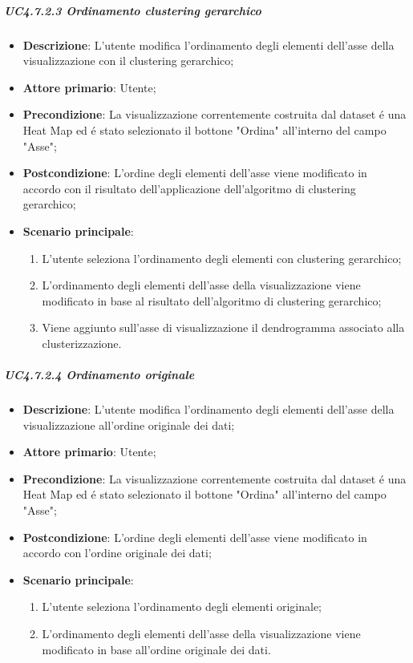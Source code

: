 \subparagraph{UC4.7.2.3 Ordinamento clustering gerarchico}
\label{spar:uc4.7.2.3}
\begin{itemize}
    \item \textbf{Descrizione}:     L'utente modifica l'ordinamento degli elementi dell'asse della visualizzazione con il clustering gerarchico;
    \item \textbf{Attore primario}: Utente;
    \item \textbf{Precondizione}:   La visualizzazione correntemente costruita dal dataset é una Heat Map ed é stato selezionato il bottone "Ordina" all'interno del campo "Asse";
    \item \textbf{Postcondizione}:  L'ordine degli elementi dell'asse viene modificato in accordo con il risultato dell'applicazione dell'algoritmo di clustering gerarchico;
    \item \textbf{Scenario principale}:
    \begin{enumerate}
        \item L'utente seleziona l'ordinamento degli elementi con clustering gerarchico;
        \item L'ordinamento degli elementi dell'asse della visualizzazione viene modificato in base al risultato dell'algoritmo di clustering gerarchico;
        \item Viene aggiunto sull'asse di visualizzazione il dendrogramma associato alla clusterizzazione.
    \end{enumerate}
\end{itemize}

\subparagraph{UC4.7.2.4 Ordinamento originale}
\label{spar:uc4.7.2.4}
\begin{itemize}
    \item \textbf{Descrizione}:     L'utente modifica l'ordinamento degli elementi dell'asse della visualizzazione all'ordine originale dei dati;
    \item \textbf{Attore primario}: Utente;
    \item \textbf{Precondizione}:   La visualizzazione correntemente costruita dal dataset é una Heat Map ed é stato selezionato il bottone "Ordina" all'interno del campo "Asse";
    \item \textbf{Postcondizione}:  L'ordine degli elementi dell'asse viene modificato in accordo con l'ordine originale dei dati;
    \item \textbf{Scenario principale}:
    \begin{enumerate}
        \item L'utente seleziona l'ordinamento degli elementi originale;
        \item L'ordinamento degli elementi dell'asse della visualizzazione viene modificato in base all'ordine originale dei dati.
    \end{enumerate}
\end{itemize}

